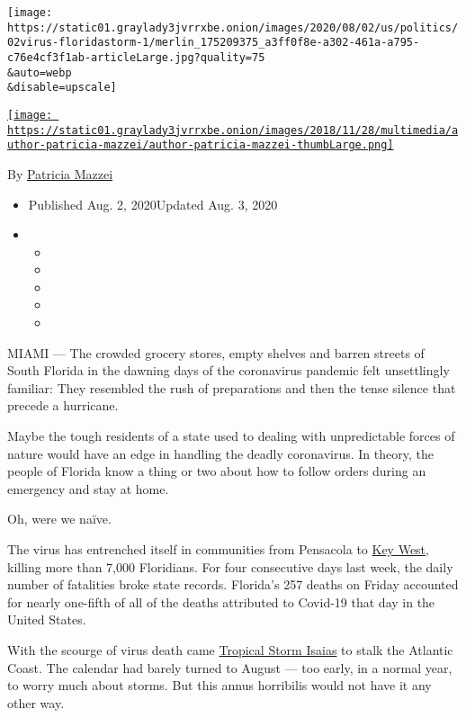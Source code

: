 \texttt{[image: https://static01.graylady3jvrrxbe.onion/images/2020/08/02/us/politics/02virus-floridastorm-1/merlin\_175209375\_a3ff0f8e-a302-461a-a795-c76e4cf3f1ab-articleLarge.jpg?quality=75\\\&auto=webp\\\&disable=upscale]}

\href{https://www.nytimes3xbfgragh.onion/by/patricia-mazzei}{\texttt{[image: https://static01.graylady3jvrrxbe.onion/images/2018/11/28/multimedia/author-patricia-mazzei/author-patricia-mazzei-thumbLarge.png]}}

By \href{https://www.nytimes3xbfgragh.onion/by/patricia-mazzei}{Patricia
Mazzei}

\begin{itemize}
\item
  Published Aug. 2, 2020Updated Aug. 3, 2020
\item
  \begin{itemize}
  \item
  \item
  \item
  \item
  \item
  \end{itemize}
\end{itemize}

MIAMI --- The crowded grocery stores, empty shelves and barren streets
of South Florida in the dawning days of the coronavirus pandemic felt
unsettlingly familiar: They resembled the rush of preparations and then
the tense silence that precede a hurricane.

Maybe the tough residents of a state used to dealing with unpredictable
forces of nature would have an edge in handling the deadly coronavirus.
In theory, the people of Florida know a thing or two about how to follow
orders during an emergency and stay at home.

Oh, were we naïve.

The virus has entrenched itself in communities from Pensacola to
\href{https://www.nytimes3xbfgragh.onion/2020/07/31/us/coronavirus-masks-enforcement-key-west.html?referringSource=articleShare}{Key
West}, killing more than 7,000 Floridians. For four consecutive days
last week, the daily number of fatalities broke state records. Florida's
257 deaths on Friday accounted for nearly one-fifth of all of the deaths
attributed to Covid-19 that day in the United States.

With the scourge of virus death came
\href{https://www.nytimes3xbfgragh.onion/2020/08/03/us/isaias-storm-updates.html}{Tropical
Storm Isaias} to stalk the Atlantic Coast. The calendar had barely
turned to August --- too early, in a normal year, to worry much about
storms. But this annus horribilis would not have it any other way.

